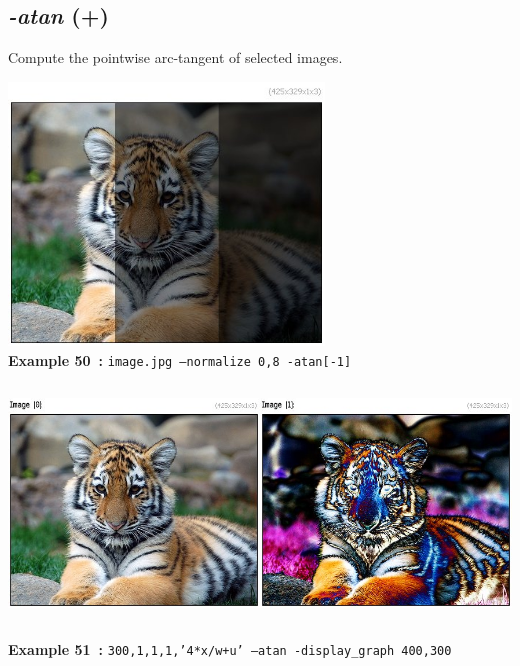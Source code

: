 \documentclass[a4paper,11pt,twoside]{book}
\begin{document}
\subsection{\emph{-atan} (+)}\vspace*{-0.5em}
Compute the pointwise arc-tangent of selected images.
\begin{center}\includegraphics[keepaspectratio=true,height=7cm,width=\textwidth]{img/gmic_def50.jpg}\\
{\footnotesize \textbf{Example 50~:} \texttt{image.jpg --normalize 0,8 -atan[-1]}}
\\\includegraphics[keepaspectratio=true,height=7cm,width=\textwidth]{img/gmic_def51.jpg}\\
{\footnotesize \textbf{Example 51~:} \texttt{300,1,1,1,'4*x/w+u' --atan -display\_graph 400,300}}
\end{center}
\end{document}
